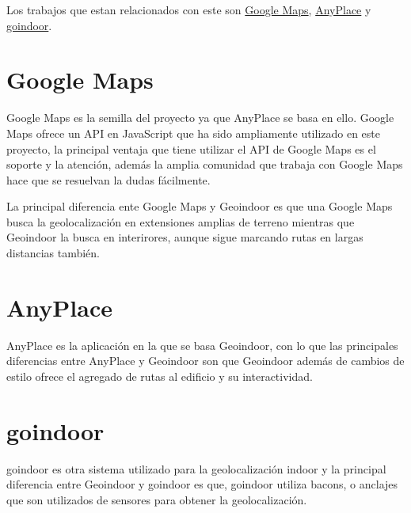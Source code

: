 
Los trabajos que estan relacionados con este son \href{https://www.google.es/maps}{Google Maps}, \href{https://anyplace.cs.ucy.ac.cy/}{AnyPlace} y \href{https://www.goindoor.co/}{goindoor}.

\section{Google Maps}\label{GoogleMaps}

Google Maps es la semilla del proyecto ya que AnyPlace se basa en ello.
Google Maps ofrece un API en JavaScript que ha sido ampliamente utilizado en este proyecto, la principal ventaja que tiene utilizar el API de Google Maps es el soporte y la atención, además la amplia comunidad que trabaja con Google Maps hace que se resuelvan la dudas fácilmente. 

La principal diferencia ente Google Maps y Geoindoor es que una Google Maps busca la geolocalización en extensiones amplias de terreno mientras que Geoindoor la busca en interirores, aunque sigue marcando rutas en largas distancias también.

\section{AnyPlace}\label{AnyPlace}

AnyPlace es la aplicación en la que se basa Geoindoor, con lo que las principales diferencias entre AnyPlace y Geoindoor son que Geoindoor además de cambios de estilo ofrece el agregado de rutas al edificio y su interactividad.

\section{goindoor}\label{goindoor}

goindoor es otra sistema utilizado para la geolocalización indoor y la principal diferencia entre Geoindoor y goindoor es que, goindoor utiliza bacons, o anclajes que son utilizados de sensores para obtener la geolocalización.
